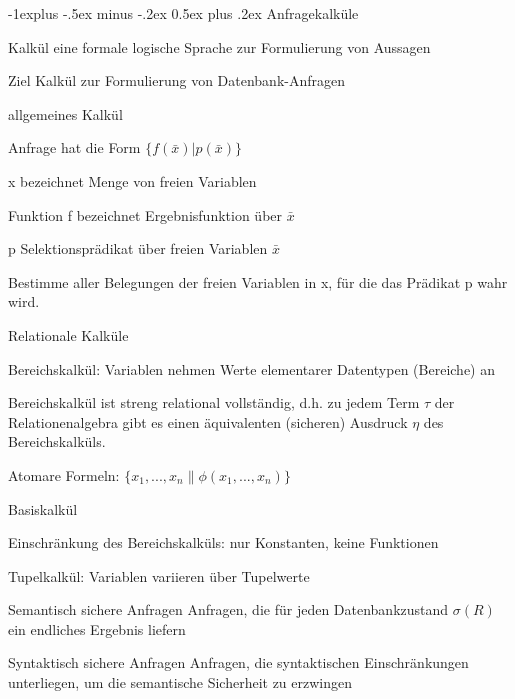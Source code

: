 \documentclass[a4paper]{article}
\makeatletter
\renewcommand{\subsection}{\@startsection{subsection}{2}{0mm}%
                                {-1explus -.5ex minus -.2ex}%
                                {0.5ex plus .2ex}%
                                {\normalfont\normalsize\bfseries}}
\makeatother
\begin{document}
\begin{multicols}{3}
    \subsection{Anfragekalküle}
    \begin{description*}
        \item[Kalkül] eine formale logische Sprache zur Formulierung von Aussagen
        \item[Ziel] Kalkül zur Formulierung von Datenbank-Anfragen
        \item[allgemeines Kalkül]
        \begin{itemize*}
            \item Anfrage hat die Form $\{f(\bar{x}) | p(\bar{x})\}$
            \begin{itemize*}
                \item x bezeichnet Menge von freien Variablen
                \item Funktion f bezeichnet Ergebnisfunktion über $\bar{x}$
                \item p Selektionsprädikat über freien Variablen $\bar{x}$
            \end{itemize*}
            \item Bestimme aller Belegungen der freien Variablen in x, für die das Prädikat p wahr wird.
        \end{itemize*}
        \item[Relationale Kalküle]
        \begin{itemize*}
            \item Bereichskalkül: Variablen nehmen Werte elementarer Datentypen (Bereiche) an
            \item Bereichskalkül ist streng relational vollständig, d.h. zu jedem Term $\tau$ der Relationenalgebra gibt es einen äquivalenten (sicheren) Ausdruck $\eta$ des Bereichskalküls.
            \item Atomare Formeln: $\{x_1,..., x_n \| \phi(x_1,..., x_n )\}$
        \end{itemize*}
        \item[Basiskalkül]
        \begin{itemize*}
            \item Einschränkung des Bereichskalküls: nur Konstanten, keine Funktionen
            \item Tupelkalkül: Variablen variieren über Tupelwerte
        \end{itemize*}
        \item[Semantisch sichere Anfragen] Anfragen, die für jeden Datenbankzustand $\sigma(R)$ ein endliches Ergebnis liefern
        \item[Syntaktisch sichere Anfragen] Anfragen, die syntaktischen Einschränkungen unterliegen, um die semantische Sicherheit zu erzwingen
    \end{description*}


\end{multicols}
\end{document}

